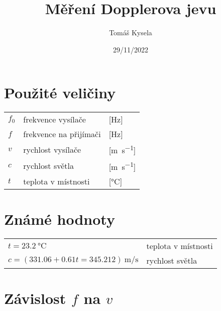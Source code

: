 \documentclass[a4paper,10pt]{article}
\title{Měření Dopplerova jevu}
\author{Tomáš Kysela}
\date{29/11/2022}
\begin{document}
\maketitle

\section{Použité veličiny}

\begin{tabular}{l l l}
 $f_0$ & frekvence vysílače & [\si{\hertz}]\\
 $f$ & frekvence na přijímači & [\si{\hertz}]\\
 $v$ & rychlost vysílače & [\si{\meter\per\second}]\\
 $c$ & rychlost světla & [\si{\meter\per\second}]\\
 $t$ & teplota v místnosti & [\si{\celsius}]
\end{tabular}

\section{Známé hodnoty}

\begin{tabular}{l l}
 $t = 23.2\ \si{\celsius}$ & teplota v místnosti\\
 $c = (331.06 + 0.61t = 345.212)\ \si{\meter\per\second}$ & rychlost světla \\
\end{tabular}

\section{Závislost $f$ na $v$}
\end{document}

